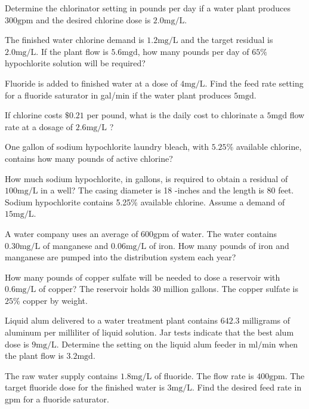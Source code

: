   Determine the chlorinator setting in pounds per day if a water plant produces $300 \mathrm{gpm}$ and the desired chlorine dose is $2.0 \mathrm{mg} / \mathrm{L}$.

  The finished water chlorine demand is $1.2 \mathrm{mg} / \mathrm{L}$ and the target residual is $2.0 \mathrm{mg} / \mathrm{L}$. If the plant flow is $5.6 \mathrm{mgd}$, how many pounds per day of $65 \%$ hypochlorite solution will be required?

  Fluoride is added to finished water at a dose of $4 \mathrm{mg} / \mathrm{L}$. Find the feed rate setting for a fluoride saturator in gal/min if the water plant produces $5 \mathrm{mgd}$.

  If chlorine costs $\$ 0.21$ per pound, what is the daily cost to chlorinate a $5 \mathrm{mgd}$ flow rate at a dosage of $2.6 \mathrm{mg} / \mathrm{L}$ ?

  One gallon of sodium hypochlorite laundry bleach, with $5.25 \%$ available chlorine, contains how many pounds of active chlorine?

  How much sodium hypochlorite, in gallons, is required to obtain a residual of $100 \mathrm{mg} / \mathrm{L}$ in a well? The casing diameter is 18 -inches and the length is 80 feet. Sodium hypochlorite contains 5.25\% available chlorine. Assume a demand of $15 \mathrm{mg} / \mathrm{L}$.

  A water company uses an average of $600 \mathrm{gpm}$ of water. The water contains $0.30 \mathrm{mg} / \mathrm{L}$ of manganese and $0.06 \mathrm{mg} / \mathrm{L}$ of iron. How many pounds of iron and manganese are pumped into the distribution system each year?

  How many pounds of copper sulfate will be needed to dose a reservoir with $0.6 \mathrm{mg} / \mathrm{L}$ of copper? The reservoir holds 30 million gallons. The copper sulfate is $25 \%$ copper by weight.

  Liquid alum delivered to a water treatment plant contains $642.3$ milligrams of aluminum per milliliter of liquid solution. Jar tests indicate that the best alum dose is $9 \mathrm{mg} / \mathrm{L}$. Determine the setting on the liquid alum feeder in $\mathrm{ml} / \mathrm{min}$ when the plant flow is $3.2 \mathrm{mgd}$.

  The raw water supply contains $1.8 \mathrm{mg} / \mathrm{L}$ of fluoride. The flow rate is $400 \mathrm{gpm}$. The target fluoride dose for the finished water is $3 \mathrm{mg} / \mathrm{L}$. Find the desired feed rate in gpm for a fluoride saturator.

